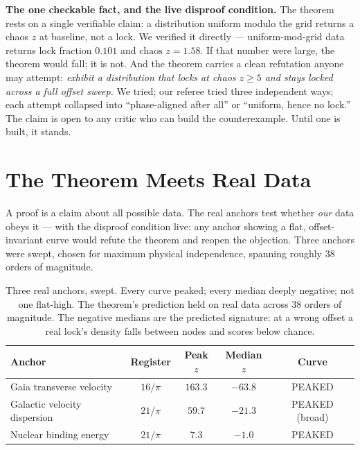 \documentclass[11pt, letterpaper, openany]{book}
\begin{document}
 
\begin{refutebox}
\textbf{The one checkable fact, and the live disproof condition.} The theorem rests on a
single verifiable claim: a distribution uniform modulo the grid returns a chaos $z$ at
baseline, not a lock. We verified it directly --- uniform-mod-grid data returns lock
fraction $0.101$ and $\text{chaos } z = 1.58$. If that number were large, the theorem would
fall; it is not. And the theorem carries a clean refutation anyone may attempt:
\emph{exhibit a distribution that locks at chaos $z \geq 5$ and stays locked across a full
offset sweep.} We tried; our referee tried three independent ways; each attempt collapsed
into ``phase-aligned after all'' or ``uniform, hence no lock.'' The claim is open to any
critic who can build the counterexample. Until one is built, it stands.
\end{refutebox}
 
\section{The Theorem Meets Real Data}
 
A proof is a claim about all possible data. The real anchors test whether \emph{our} data
obeys it --- with the disproof condition live: any anchor showing a flat, offset-invariant
curve would refute the theorem and reopen the objection. Three anchors were swept, chosen
for maximum physical independence, spanning roughly $38$ orders of magnitude.
 
\begin{table}[H]
\centering
\renewcommand{\arraystretch}{1.4}
\begin{tabular}{|l|c|c|c|c|}
\hline
\rowcolor{kishblue!10}
\textbf{Anchor} & \textbf{Register} & \textbf{Peak $z$} & \textbf{Median $z$} & \textbf{Curve} \\
\hline\hline
Gaia transverse velocity & $16/\pi$ & $163.3$ & $-63.8$ & PEAKED \\ \hline
\rowcolor{kishblue!3}
Galactic velocity dispersion & $21/\pi$ & $59.7$ & $-21.3$ & PEAKED (broad) \\ \hline
Nuclear binding energy & $21/\pi$ & $7.3$ & $-1.0$ & PEAKED \\ \hline
\end{tabular}
\caption{Three real anchors, swept. Every curve peaked; every median deeply negative; not
one flat-high. The theorem's prediction held on real data across $38$ orders of magnitude.
The negative medians are the predicted signature: at a wrong offset a real lock's density
falls between nodes and scores below chance.}
\label{tab:nl_curves}
\end{table}
 
\end{document}
